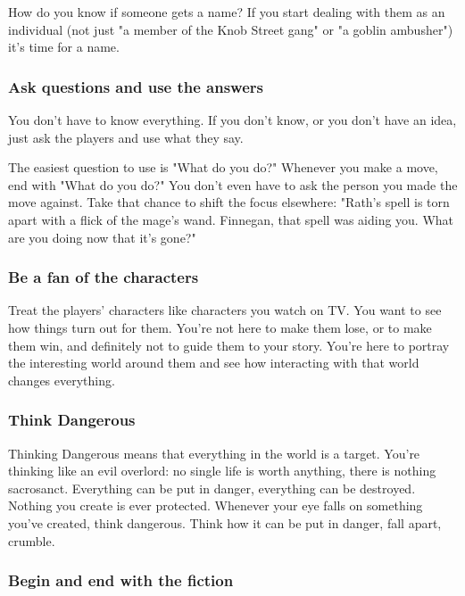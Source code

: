 How do you know if someone gets a name? If you start dealing with them as an individual (not just "a member of the Knob Street gang" or "a goblin ambusher") it's time for a name.

 
\subsubsection{Ask questions and use the answers}    
 

You don't have to know everything. If you don't know, or you don't have an idea, just ask the players and use what they say.

 

The easiest question to use is "What do you do?" Whenever you make a move, end with "What do you do?" You don't even have to ask the person you made the move against. Take that chance to shift the focus elsewhere: "Rath's spell is torn apart with a flick of the mage's wand. Finnegan, that spell was aiding you. What are you doing now that it's gone?"

 
\subsubsection{Be a fan of the characters}    
 

Treat the players' characters like characters you watch on TV. You want to see how things turn out for them. You're not here to make them lose, or to make them win, and definitely not to guide them to your story. You're here to portray the interesting world around them and see how interacting with that world changes everything.

 
\subsubsection{Think Dangerous}   
 

Thinking Dangerous means that everything in the world is a target. You're thinking like an evil overlord: no single life is worth anything, there is nothing sacrosanct. Everything can be put in danger, everything can be destroyed. Nothing you create is ever protected. Whenever your eye falls on something you've created, think dangerous. Think how it can be put in danger, fall apart, crumble.

 
\subsubsection{Begin and end with the fiction}   
 

